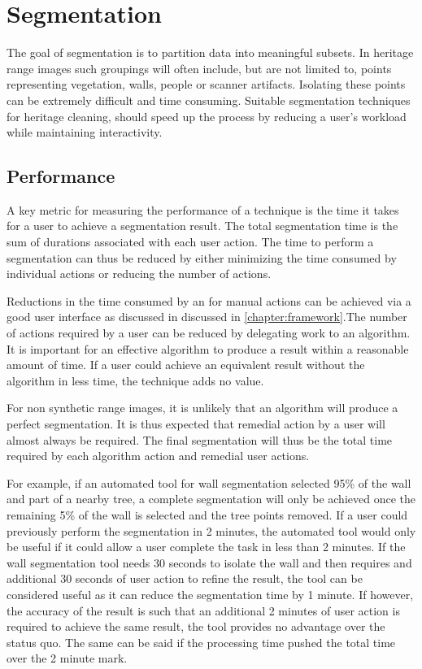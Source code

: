 \chapter{Segmentation}
The goal of segmentation is to partition data into meaningful subsets. In heritage range images such groupings will often include, but are not limited to, points representing vegetation, walls, people or scanner artifacts. Isolating these points can be extremely difficult and time consuming. Suitable segmentation techniques for heritage cleaning, should speed up the process by reducing a user's workload while maintaining interactivity.


\section{Performance}
A key metric for measuring the performance of a technique is the time it takes for a user to achieve a segmentation result. The total segmentation time is the sum of durations associated with each user action. The time to perform a segmentation can thus be reduced by either minimizing the time consumed by individual actions or reducing the number of actions.

Reductions in the time consumed by an for manual actions can be achieved via a good user interface as discussed in discussed in \ref{chapter:framework}.The number of actions required by a user can be reduced by delegating work to an algorithm. It is important for an effective algorithm to produce a result within a reasonable amount of time. If a user could achieve an equivalent result without the algorithm in less time, the technique adds no value.

For non synthetic range images, it is unlikely that an algorithm will produce a perfect segmentation. It is thus expected that remedial action by a user will almost always be required. The final segmentation will thus be the total time required by each algorithm action and remedial user actions.

For example, if an automated tool for wall segmentation selected 95\% of the wall and part of a nearby tree, a complete segmentation will only be achieved once the remaining 5\% of the wall is selected and the tree points removed. If a user could previously perform the segmentation in 2 minutes, the automated tool would only be useful if it could allow a user complete the task in less than 2 minutes. If the wall segmentation tool needs 30 seconds to isolate the wall and then requires and additional 30 seconds of user action to refine the result, the tool can be considered useful as it can reduce the segmentation time by 1 minute. If however, the accuracy of the result is such that an additional 2 minutes of user action is required to achieve the same result, the tool provides no advantage over the status quo. The same can be said if the processing time pushed the total time over the 2 minute mark.

